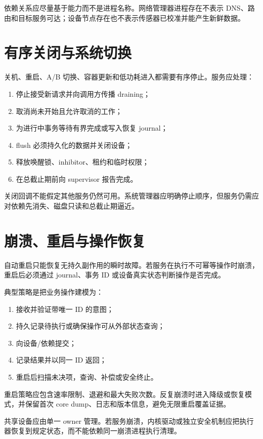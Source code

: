 依赖关系应尽量基于能力而不是进程名称。网络管理器进程存在不表示 DNS、路由和目标服务可达；设备节点存在也不表示传感器已校准并能产生新鲜数据。

\section{有序关闭与系统切换}

关机、重启、A/B 切换、容器更新和低功耗进入都需要有序停止。服务应处理：

\begin{enumerate}
  \item 停止接受新请求并向调用方传播 draining；
  \item 取消尚未开始且允许取消的工作；
  \item 为进行中事务等待有界完成或写入恢复 journal；
  \item flush 必须持久化的数据并关闭设备；
  \item 释放唤醒锁、inhibitor、租约和临时权限；
  \item 在总截止期前向 supervisor 报告完成。
\end{enumerate}

关闭回调不能假定其他服务仍然可用。系统管理器应明确停止顺序，但服务仍需应对依赖先消失、磁盘只读和总截止期逼近。

\section{崩溃、重启与操作恢复}

自动重启只能恢复无持久副作用的瞬时故障。若服务在执行不可幂等操作时崩溃，重启后必须通过 journal、事务 ID 或设备真实状态判断操作是否完成。

典型策略是把业务操作建模为：

\begin{enumerate}
  \item 接收并验证带唯一 ID 的意图；
  \item 持久记录待执行或确保操作可从外部状态查询；
  \item 向设备/依赖提交；
  \item 记录结果并以同一 ID 返回；
  \item 重启后扫描未决项，查询、补偿或安全终止。
\end{enumerate}

重启策略应包含速率限制、退避和最大失败次数。反复崩溃时进入降级或恢复模式，并保留首次 core dump、日志和版本信息，避免无限重启覆盖证据。

共享设备应由单一 owner 管理。若服务崩溃，内核驱动或独立安全机制应把执行器恢复到规定状态，而不能依赖同一崩溃进程执行清理。

